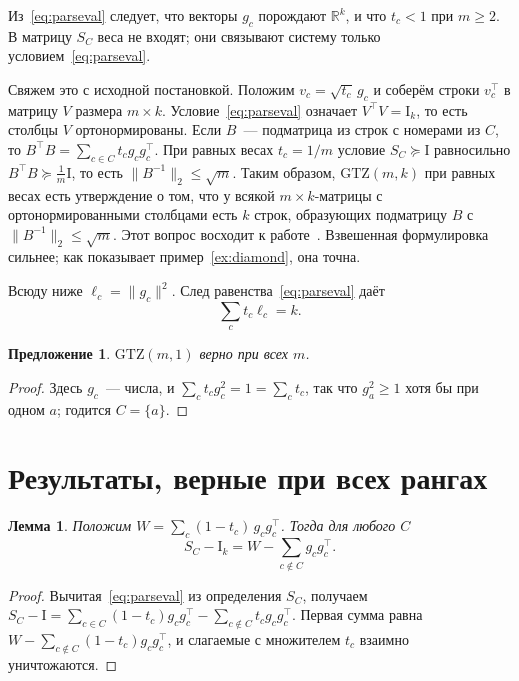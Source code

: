 \documentclass[11pt,a4paper]{article}
\theoremstyle{plain}
\newtheorem{proposition}[theorem]{Предложение}
\newtheorem{lemma}[theorem]{Лемма}
\theoremstyle{definition}
\theoremstyle{remark}
\newcommand{\RR}{\mathbb{R}}
\newcommand{\Id}{\mathrm{I}}
\newcommand{\GTZ}{\mathrm{GTZ}}
\newcommand{\T}{^{\!\top}}
\begin{document}
Из~\eqref{eq:parseval} следует, что векторы $g_c$ порождают $\RR^k$, и что
$t_c<1$ при $m\ge2$. В матрицу $S_C$ веса не входят; они связывают систему
только условием~\eqref{eq:parseval}.

Свяжем это с исходной постановкой. Положим $v_c=\sqrt{t_c}\,g_c$ и соберём
строки $v_c\T$ в матрицу $V$ размера $m\times k$. Условие~\eqref{eq:parseval}
означает $V\T V=\Id_k$, то есть столбцы $V$ ортонормированы. Если $B$~---
подматрица из строк с номерами из $C$, то $B\T B=\sum_{c\in C}t_cg_cg_c\T$.
При равных весах $t_c=1/m$ условие $S_C\succeq\Id$ равносильно
$B\T B\succeq\frac1m\Id$, то есть $\|B^{-1}\|_2\le\sqrt m$. Таким образом,
$\GTZ(m,k)$ при равных весах есть утверждение о том, что у всякой
$m\times k$-матрицы с ортонормированными столбцами есть $k$ строк, образующих
подматрицу $B$ с $\|B^{-1}\|_2\le\sqrt m$. Этот вопрос восходит к
работе~\cite{gtz}. Взвешенная формулировка сильнее; как показывает
пример~\ref{ex:diamond}, она точна.

Всюду ниже $\ell_c=\|g_c\|^2$. След равенства~\eqref{eq:parseval} даёт
\begin{equation}\label{eq:trace}
  \sum_c t_c\ell_c=k .
\end{equation}

\begin{proposition}\label{prop:rankone}
$\GTZ(m,1)$ верно при всех $m$.
\end{proposition}
\begin{proof}
Здесь $g_c$~--- числа, и $\sum_ct_cg_c^2=1=\sum_ct_c$, так что $g_a^2\ge1$
хотя бы при одном $a$; годится $C=\{a\}$.
\end{proof}

\section{Результаты, верные при всех рангах}

\begin{lemma}\label{lem:identity}
Положим $W=\sum_c(1-t_c)\,g_cg_c\T$. Тогда для любого $C$
\[
  S_C-\Id_k=W-\sum_{c\notin C}g_cg_c\T .
\]
\end{lemma}
\begin{proof}
Вычитая~\eqref{eq:parseval} из определения $S_C$, получаем
$S_C-\Id=\sum_{c\in C}(1-t_c)g_cg_c\T-\sum_{c\notin C}t_cg_cg_c\T$. Первая сумма
равна $W-\sum_{c\notin C}(1-t_c)g_cg_c\T$, и слагаемые с множителем $t_c$
взаимно уничтожаются.
\end{proof}
\end{document}

